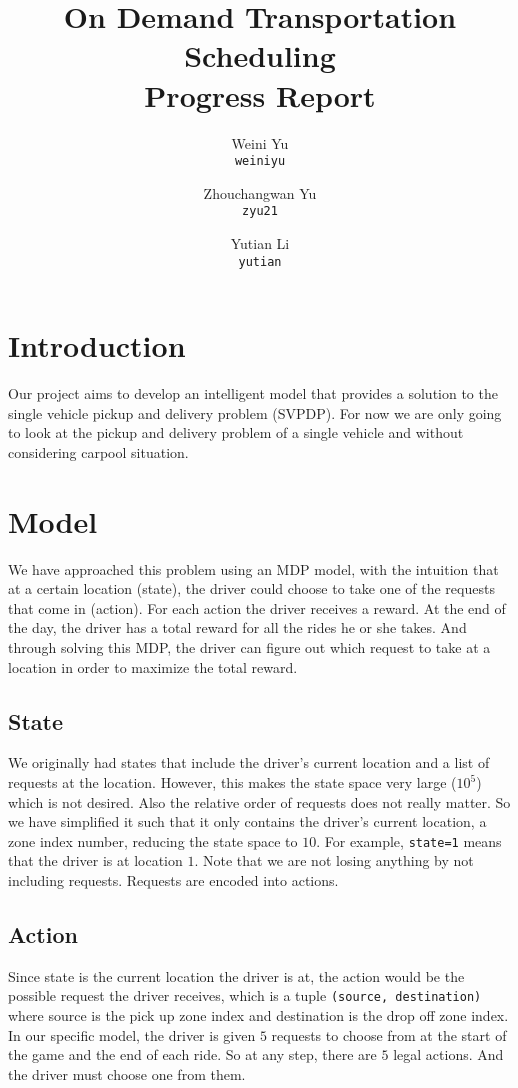 \documentclass{article}
\title{On Demand Transportation Scheduling \\ \large{Progress Report}}
\author{Weini Yu\\\texttt{weiniyu}\and Zhouchangwan Yu\\\texttt{zyu21}\and Yutian Li\\\texttt{yutian}}
\begin{document}
\maketitle

\section{Introduction}
Our project aims to develop an intelligent model that provides a solution to the single vehicle pickup and delivery problem (SVPDP). For now we are only going to look at the pickup and delivery problem of a single vehicle and without considering carpool situation.

\section{Model}
We have approached this problem using an MDP model, with the intuition that at a certain location (state), the driver could choose to take one of the requests that come in (action). For each action the driver receives a reward. At the end of the day, the driver has a total reward for all the rides he or she takes. And through solving this MDP, the driver can figure out which request to take at a location in order to maximize the total reward.

\subsection{State}
We originally had states that include the driver's current location and a list of requests at the location. However, this makes the state space very large ($10^{5}$) which is not desired. Also the relative order of requests does not really matter. So we have simplified it such that it only contains the driver's current location, a zone index number, reducing the state space to $10$. For example, \texttt{state=1} means that the driver is at location $1$. Note that we are not losing anything by not including requests. Requests are encoded into actions.

\subsection{Action}
Since state is the current location the driver is at, the action would be the possible request the driver receives, which is a tuple \texttt{(source, destination)} where source is the pick up zone index and destination is the drop off zone index. In our specific model, the driver is given $5$ requests to choose from at the start of the game and the end of each ride. So at any step, there are $5$ legal actions. And the driver must choose one from them.
\end{document}
